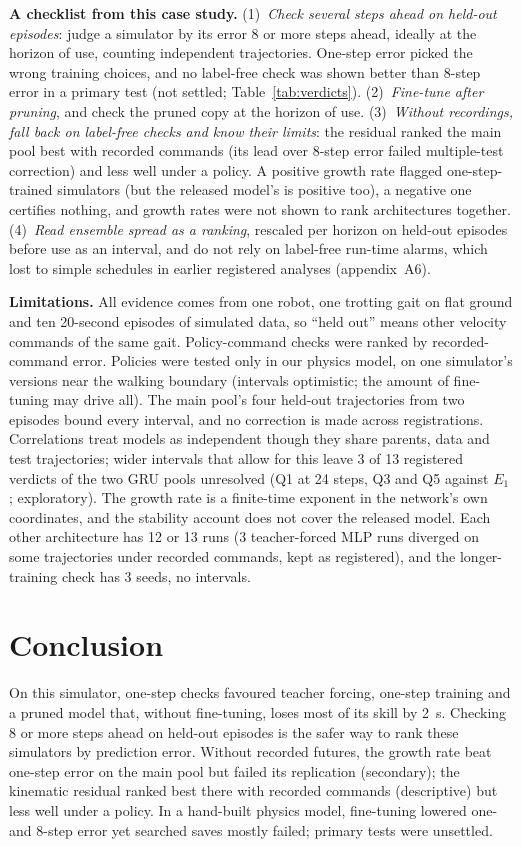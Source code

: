 \textbf{A checklist from this case study.} (1)~\emph{Check several steps ahead on held-out episodes}: judge a
simulator by its error 8 or more steps ahead, ideally at the horizon of use, counting independent trajectories.
One-step error picked the wrong training choices, and no label-free check was shown better than 8-step error in a primary test
(not settled; Table~\ref{tab:verdicts}). (2)~\emph{Fine-tune after pruning}, and check the pruned copy at the horizon of use.
(3)~\emph{Without recordings, fall back on label-free checks and know their limits}: the residual ranked the main pool
best with recorded commands (its lead over 8-step error failed multiple-test correction) and less well under a policy.
A positive growth rate flagged one-step-trained simulators (but the
released model's is positive too), a negative one certifies nothing, and growth rates were not shown to rank architectures
together. (4)~\emph{Read ensemble spread as a ranking}, rescaled per horizon on held-out episodes before use as an
interval, and do not rely on label-free run-time alarms, which lost to simple schedules in earlier registered analyses
(appendix~A6).

\textbf{Limitations.} All evidence comes from one robot, one trotting gait on flat ground and ten 20-second episodes
of simulated data, so ``held out'' means other velocity commands of the same gait. Policy-command checks were ranked by recorded-command error. Policies were tested only in our physics model,
on one simulator's versions near the walking boundary (intervals optimistic; the amount of fine-tuning may drive all). The main pool's four held-out trajectories from two episodes bound every interval, and no correction is
made across registrations. Correlations treat models as independent though they share parents, data and test
trajectories; wider intervals that allow for this leave 3 of 13 registered verdicts of the two GRU
pools unresolved (Q1 at 24 steps, Q3 and Q5 against $E_1$; exploratory). The growth rate is a finite-time exponent in the network's own coordinates, and the
stability account does not cover the released model. Each other architecture has 12 or
13 runs (3 teacher-forced MLP runs diverged on some trajectories under recorded commands, kept as registered), and the longer-training check has 3 seeds, no intervals.

\section{Conclusion}\label{sec:conclusion}
On this simulator, one-step checks favoured teacher forcing, one-step training and a pruned model that, without
fine-tuning, loses most of its skill by 2~s. Checking 8 or more steps ahead on held-out episodes is the safer way to rank these simulators by prediction error.
Without recorded futures, the growth rate beat one-step error on the main pool but failed its replication (secondary); the
kinematic residual ranked best there with recorded commands (descriptive) but less well under a policy. In a hand-built physics model, fine-tuning lowered one- and 8-step error yet searched saves mostly failed; primary tests were unsettled.

